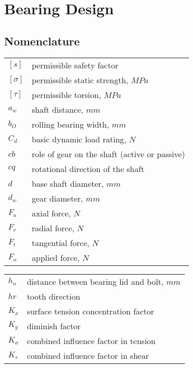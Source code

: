 \chapter{Bearing Design}
\section{Nomenclature}
\begin{tabular}[t]{lp{6.5cm}}
	$ [s] $ & permissible safety factor\\
	$ [\sigma] $ & permissible static strength, $ \unit{MPa} $\\
	$ [\tau] $ & permissible torsion, $ \unit{MPa} $\\
	$ a_w $ & shaft distance, $ \unit{mm} $\\
	$ b_O $ & rolling bearing width, $ \unit{mm}$\\
	$ C_d $ & basic dynamic load rating, $ \unit{N} $\\
	$ cb $ & role of gear on the shaft (active or passive)\\
	$ cq $ & rotational direction of the shaft\\
	$ d $ & base shaft diameter, $ \unit{mm} $\\
	$ d_w $ & gear diameter, $ \unit{mm} $\\
	$ F_a $ & axial force, $ \unit{N} $\\
	$ F_r $ & radial force, $ \unit{N} $\\
	$ F_t $ & tangential force, $ \unit{N} $\\
	$ F_x $ & applied force, $ \unit{N} $\\	
\end{tabular}
\begin{tabular}[t]{lp{6.5cm}}
	$ h_n $ & distance between bearing lid and bolt, $ \unit{mm} $\\
	$ hr $ & tooth direction\\
	$ K_x $ & surface tension concentration factor\\
	$ K_y $ & diminish factor\\
	$ K_\sigma $ & combined influence factor in tension\\
	$ K_\tau $ & combined influence factor in shear\\
\end{tabular}\newpage
